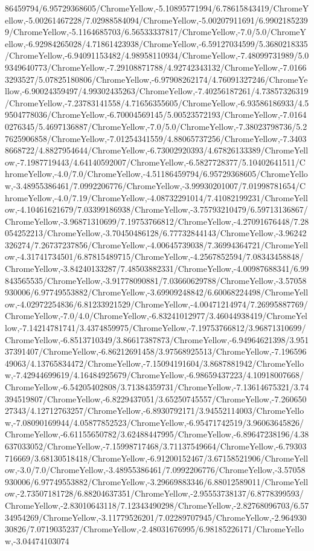 {\begin{tikzternal}
86459794/6.95729368605/ChromeYellow,-5.10895771994/6.78615843419/ChromeYellow,-5.00261467228/7.02988584094/ChromeYellow,-5.00207911691/6.99021852399/ChromeYellow,-5.1164685703/6.56533337817/ChromeYellow,-7.0/5.0/ChromeYellow,-6.92984265028/4.71861423938/ChromeYellow,-6.59127034599/5.3680218335/ChromeYellow,-6.94091153482/4.98958110934/ChromeYellow,-7.48099731989/5.09349640773/ChromeYellow,-7.29108871788/4.92742343132/ChromeYellow,-7.01663293527/5.07825180806/ChromeYellow,-6.97908262174/4.76091327246/ChromeYellow,-6.90024359497/4.99302435263/ChromeYellow,-7.40256187261/4.73857326319/ChromeYellow,-7.23783141558/4.71656355605/ChromeYellow,-6.93586186933/4.59504778036/ChromeYellow,-6.70004569145/5.00523572193/ChromeYellow,-7.01640276345/5.4697136887/ChromeYellow,-7.0/5.0/ChromeYellow,-7.38023798736/5.27625906858/ChromeYellow,-7.01254341559/4.88065737256/ChromeYellow,-7.34038668722/4.8827954644/ChromeYellow,-6.73002920393/4.67826133389/ChromeYellow,-7.1987719443/4.64140592007/ChromeYellow,-6.5827728377/5.10402641511/ChromeYellow,-4.0/7.0/ChromeYellow,-4.51186459794/6.95729368605/ChromeYellow,-3.48955386461/7.0992206776/ChromeYellow,-3.99930201007/7.01998781654/ChromeYellow,-4.0/7.19/ChromeYellow,-4.08732291014/7.41082199231/ChromeYellow,-4.10461621679/7.03399186938/ChromeYellow,-3.75793210479/6.59713136867/ChromeYellow,-3.96871310699/7.19753766812/ChromeYellow,-4.27091676448/7.28054252213/ChromeYellow,-3.70450486128/6.77732844143/ChromeYellow,-3.96242326274/7.26737237856/ChromeYellow,-4.00645739038/7.36994364721/ChromeYellow,-4.31741734501/6.87815489715/ChromeYellow,-4.2567852594/7.08343458848/ChromeYellow,-3.84240133287/7.48503882331/ChromeYellow,-4.00987688341/6.99843565535/ChromeYellow,-3.91778090881/7.03660629788/ChromeYellow,-3.57058930006/6.97749553882/ChromeYellow,-3.69909248842/6.60068224498/ChromeYellow,-4.02972254836/6.81233921529/ChromeYellow,-4.00471214974/7.26995887769/ChromeYellow,-7.0/4.0/ChromeYellow,-6.83241012977/3.46044938419/ChromeYellow,-7.14214781741/3.4374859975/ChromeYellow,-7.19753766812/3.96871310699/ChromeYellow,-6.8513710349/3.86617387873/ChromeYellow,-6.94964621398/3.95137391407/ChromeYellow,-6.86212691458/3.97568925513/ChromeYellow,-7.19659649063/4.13765834472/ChromeYellow,-7.15094191604/3.8687881942/ChromeYellow,-7.42944699619/4.16484925679/ChromeYellow,-6.98659437223/4.10918007668/ChromeYellow,-6.54205402808/3.71384359731/ChromeYellow,-7.13614675321/3.74394519807/ChromeYellow,-6.8229437051/3.65250745557/ChromeYellow,-7.26065027343/4.12712763257/ChromeYellow,-6.8930792171/3.94552114003/ChromeYellow,-7.08090169944/4.05877852523/ChromeYellow,-6.95471742519/3.96063645826/ChromeYellow,-6.61155650782/3.62488447995/ChromeYellow,-6.89647238196/4.38637033052/ChromeYellow,-7.15998717468/3.71137549664/ChromeYellow,-6.79303716669/3.68130518418/ChromeYellow,-6.91200152467/3.67158521906/ChromeYellow,-3.0/7.0/ChromeYellow,-3.48955386461/7.0992206776/ChromeYellow,-3.57058930006/6.97749553882/ChromeYellow,-3.29669883346/6.88012589011/ChromeYellow,-2.73507181728/6.88204637351/ChromeYellow,-2.95553738137/6.8778399593/ChromeYellow,-2.83010643118/7.12343490298/ChromeYellow,-2.82768096703/6.5734954269/ChromeYellow,-3.11779526201/7.02289707945/ChromeYellow,-2.96493030826/7.0719035237/ChromeYellow,-2.48031676995/6.98185226171/ChromeYellow,-3.04474103074
\end{tikzternal}}

